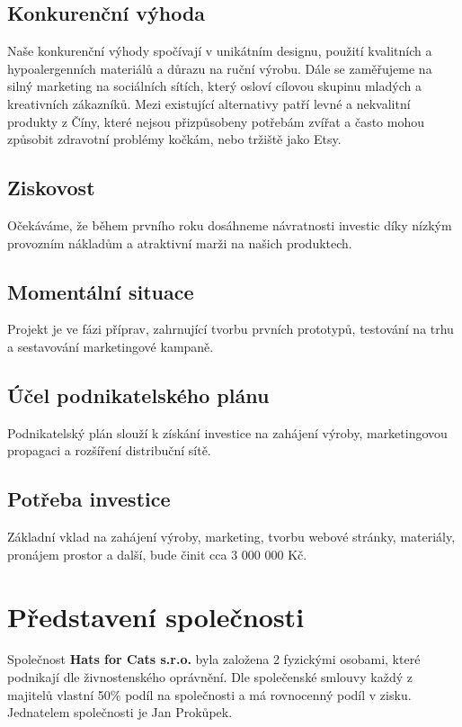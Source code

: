 \documentclass[12pt, a4paper]{article}
\begin{document}
\subsection{Konkurenční výhoda}
Naše konkurenční výhody spočívají v unikátním designu, použití kvalitních a hypoalergenních materiálů a důrazu na ruční výrobu. Dále se zaměřujeme na silný marketing na sociálních sítích, který osloví cílovou skupinu mladých a kreativních zákazníků.
Mezi existující alternativy patří levné a nekvalitní produkty z Číny, které nejsou přizpůsobeny potřebám zvířat a často mohou
způsobit zdravotní problémy kočkám, nebo tržiště jako Etsy.

\subsection{Ziskovost}
Očekáváme, že během prvního roku dosáhneme návratnosti investic díky 
nízkým provozním nákladům 
a atraktivní marži na našich produktech.

\subsection{Momentální situace}
Projekt je ve fázi příprav, zahrnující tvorbu prvních prototypů, 
testování na trhu a sestavování marketingové kampaně.

\subsection{Účel podnikatelského plánu}
Podnikatelský plán slouží k získání investice na zahájení výroby, 
marketingovou propagaci a rozšíření distribuční sítě.

\subsection{Potřeba investice}
Základní vklad na zahájení výroby, marketing, tvorbu webové stránky, materiály,
pronájem prostor a další, bude činit cca 3 000 000 Kč.

\section{Představení společnosti}
Společnost \textbf{Hats for Cats s.r.o.} byla založena 2 fyzickými osobami,
které podnikají dle živnostenského oprávnění. Dle společenské smlouvy
každý z majitelů vlastní 50\% podíl na společnosti a má rovnocenný podíl v zisku.
Jednatelem společnosti je Jan Prokůpek.
\end{document}
